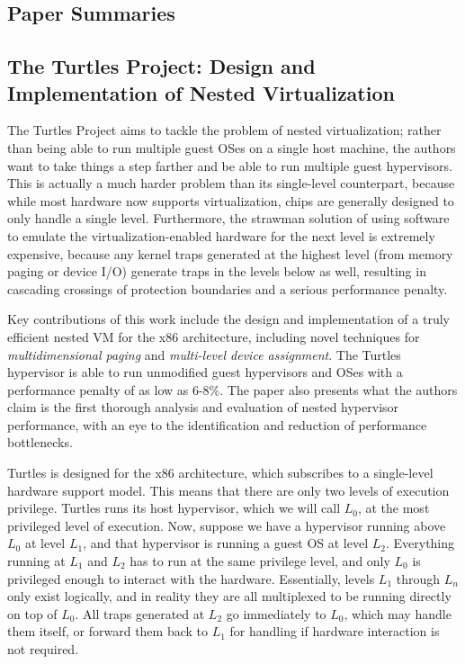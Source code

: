\documentclass[10pt]{article}
\begin{document}
\begin{multicols*}{2}
\section{Paper Summaries}
\label{sec:summaries}

\subsection{The Turtles Project: Design and Implementation of Nested Virtualization}
\label{sec:summaries/turtles}

The Turtles Project \cite{ref:turtles} aims to tackle the problem of
nested virtualization; rather than being able to run multiple guest OSes
on a single host machine, the authors want to take things a step farther
and be able to run multiple guest hypervisors.  This is actually a
much harder problem than its single-level counterpart, because while
most hardware now supports virtualization, chips are generally designed
to only handle a single level.  Furthermore, the strawman solution of
using software to emulate the virtualization-enabled hardware for the next level is
extremely expensive, because any kernel traps generated at the highest
level (from memory paging or device I/O) generate traps in the levels
below as well, resulting in cascading crossings of protection
boundaries and a serious performance penalty.

Key contributions of this work include the design and implementation
of a truly efficient nested VM for the x86 architecture, including novel
techniques for \emph{multidimensional paging} and
\emph{multi-level device assignment}.  The Turtles hypervisor is able to
run unmodified guest hypervisors and OSes with a performance penalty of
as low as 6-8\%.  The paper also presents what the authors claim is the
first thorough analysis and evaluation of nested hypervisor performance,
with an eye to the identification and reduction of performance bottlenecks.

Turtles is designed for the x86 architecture, which subscribes to a
single-level hardware support model.  This means that there are only two
levels of execution privilege.  Turtles runs its host hypervisor, which
we will call $L_0$, at the most privileged level of execution.  Now, suppose
we have a hypervisor running above $L_0$ at level $L_1$, and that hypervisor
is running a guest OS at level $L_2$.  Everything running at $L_1$ and $L_2$
has to run at the same privilege level, and only $L_0$ is privileged enough
to interact with the hardware.  Essentially, levels $L_1$ through $L_n$ only
exist logically, and in reality they are all multiplexed to be running directly
on top of $L_0$.  All traps generated at $L_2$ go immediately to $L_0$, which
may handle them itself, or forward them back to $L_1$ for handling if hardware
interaction is not required.


\end{multicols*}
\end{document}
